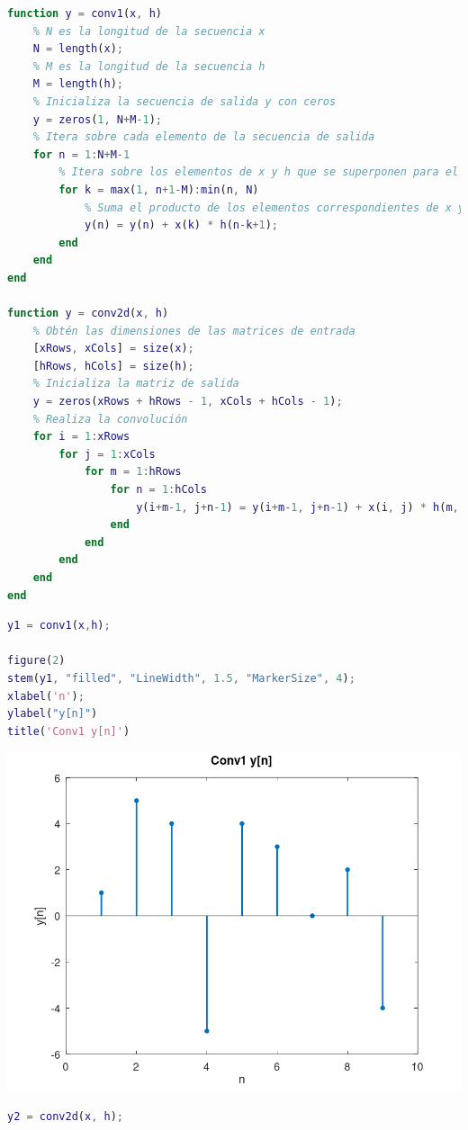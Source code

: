 \documentclass[12pt]{article}
\begin{document}
\begin{itemize}[leftmargin=*]
\begin{lstlisting}[language=matlab]
function y = conv1(x, h)
	% N es la longitud de la secuencia x
	N = length(x);
	% M es la longitud de la secuencia h
	M = length(h);
	% Inicializa la secuencia de salida y con ceros
	y = zeros(1, N+M-1);
	% Itera sobre cada elemento de la secuencia de salida
	for n = 1:N+M-1
		% Itera sobre los elementos de x y h que se superponen para el elemento actual de y
		for k = max(1, n+1-M):min(n, N)
			% Suma el producto de los elementos correspondientes de x y h a la secuencia de salida
			y(n) = y(n) + x(k) * h(n-k+1);
		end
	end
end

function y = conv2d(x, h)
	% Obtén las dimensiones de las matrices de entrada
	[xRows, xCols] = size(x);
	[hRows, hCols] = size(h);
	% Inicializa la matriz de salida
	y = zeros(xRows + hRows - 1, xCols + hCols - 1);
	% Realiza la convolución
	for i = 1:xRows
		for j = 1:xCols
			for m = 1:hRows
				for n = 1:hCols
					y(i+m-1, j+n-1) = y(i+m-1, j+n-1) + x(i, j) * h(m, n);
				end
			end
		end
	end
end
\end{lstlisting}
	
	\begin{lstlisting}[language=matlab]
y1 = conv1(x,h);

figure(2)
stem(y1, "filled", "LineWidth", 1.5, "MarkerSize", 4);
xlabel('n');
ylabel("y[n]")
title('Conv1 y[n]')
	\end{lstlisting}
	\begin{center}
		\includegraphics[width=0.7\linewidth]{Imágenes/Figura2}
	\end{center}
\begin{lstlisting}[language=matlab]
y2 = conv2d(x, h);


\end{lstlisting}
\end{itemize}
\end{document}
